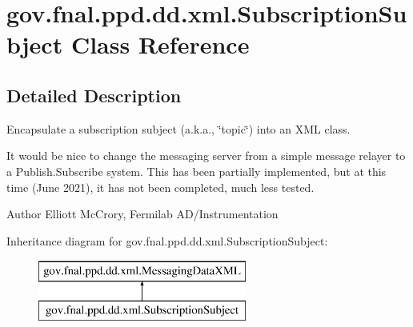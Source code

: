 \hypertarget{classgov_1_1fnal_1_1ppd_1_1dd_1_1xml_1_1SubscriptionSubject}{\section{gov.\-fnal.\-ppd.\-dd.\-xml.\-Subscription\-Subject Class Reference}
\label{classgov_1_1fnal_1_1ppd_1_1dd_1_1xml_1_1SubscriptionSubject}
}


\subsection{Detailed Description}
Encapsulate a subscription subject (a.\-k.\-a., \char`\"{}topic\char`\"{}) into an X\-M\-L class. 

It would be nice to change the messaging server from a simple message relayer to a Publish.\-Subscribe system. This has been partially implemented, but at this time (June 2021), it has not been completed, much less tested. 

\begin{DoxyAuthor}{Author}
Elliott Mc\-Crory, Fermilab A\-D/\-Instrumentation 
\end{DoxyAuthor}
Inheritance diagram for gov.\-fnal.\-ppd.\-dd.\-xml.\-Subscription\-Subject\-:\begin{figure}[H]
\begin{center}
\leavevmode
\includegraphics[height=2.000000cm]{classgov_1_1fnal_1_1ppd_1_1dd_1_1xml_1_1SubscriptionSubject}
\end{center}
\end{figure}

